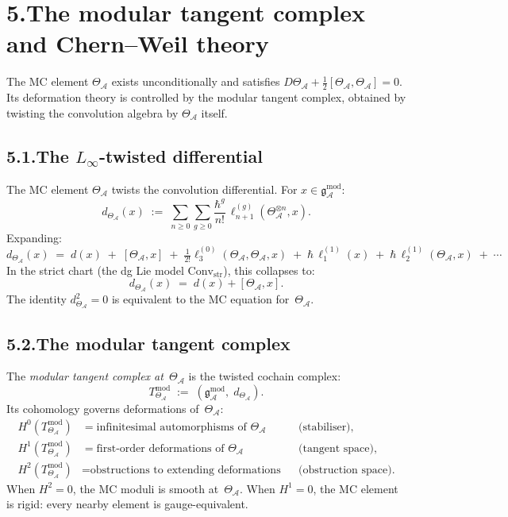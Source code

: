 \documentclass[11pt]{report}
\theoremstyle{definition}
\theoremstyle{remark}
\providecommand{\cA}{\mathcal{A}}
\providecommand{\gAmod}{\mathfrak{g}^{\mathrm{mod}}_\cA}
\providecommand{\Convstr}{\mathrm{Conv}_{\mathrm{str}}}
\numberwithin{equation}{section}
\begin{document}
\section*{5.\quad The modular tangent complex and Chern--Weil theory}

The MC element $\Theta_\cA$ exists
unconditionally and satisfies
$D\Theta_\cA + \tfrac{1}{2}[\Theta_\cA,\Theta_\cA] = 0$. Its
deformation theory is controlled by the modular tangent complex,
obtained by twisting the convolution algebra by $\Theta_\cA$ itself.

\subsection*{5.1.\enspace The $L_\infty$-twisted differential}

The MC element $\Theta_\cA$ twists the convolution differential. For $x\in\gAmod$:
\[
d_{\Theta_\cA}(x)
\;:=\;
\sum_{n\ge 0}\sum_{g\ge 0}
\frac{\hbar^g}{n!}\,
\ell_{n+1}^{(g)}(\Theta_\cA^{\otimes n},x).
\]
Expanding:
\[
d_{\Theta_\cA}(x)
\;=\;
d(x)
\;+\;
[\Theta_\cA,x]
\;+\;
\tfrac{1}{2!}\ell_3^{(0)}(\Theta_\cA,\Theta_\cA,x)
\;+\;
\hbar\,\ell_1^{(1)}(x)
\;+\;
\hbar\,\ell_2^{(1)}(\Theta_\cA,x)
\;+\;\cdots
\]
In the strict chart (the dg Lie model $\Convstr$), this collapses to:
\[
d_{\Theta_\cA}(x)\;=\;d(x)+[\Theta_\cA,x].
\]
The identity $d_{\Theta_\cA}^2=0$ is equivalent to the MC equation
for~$\Theta_\cA$.

\subsection*{5.2.\enspace The modular tangent complex}

The \emph{modular tangent complex at~$\Theta_\cA$} is the twisted
cochain complex:
\[
T^{\mathrm{mod}}_{\Theta_\cA}
\;:=\;
(\gAmod,\;d_{\Theta_\cA}).
\]
Its cohomology governs deformations of~$\Theta_\cA$:
\begin{align*}
H^0(T^{\mathrm{mod}}_{\Theta_\cA})
&=\text{infinitesimal automorphisms of~$\Theta_\cA$}
 &&\text{(stabiliser)},\\[3pt]
H^1(T^{\mathrm{mod}}_{\Theta_\cA})
&=\text{first-order deformations of~$\Theta_\cA$}
 &&\text{(tangent space)},\\[3pt]
H^2(T^{\mathrm{mod}}_{\Theta_\cA})
&=\text{obstructions to extending deformations}
 &&\text{(obstruction space)}.
\end{align*}
When $H^2=0$, the MC moduli is smooth at~$\Theta_\cA$.
When $H^1=0$, the MC element is rigid: every nearby element is
gauge-equivalent.
\end{document}

